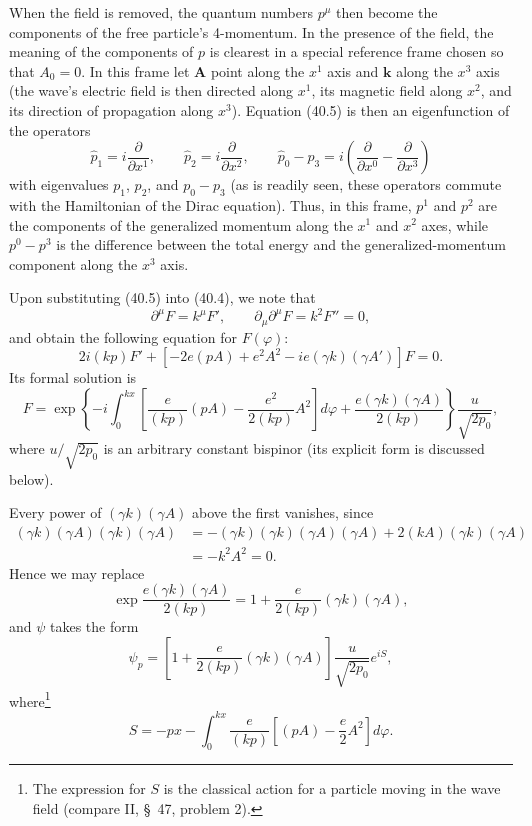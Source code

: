When the field is removed, the quantum numbers $p^\mu$ then become the components of the free particle's 4-momentum. In the presence of the field, the meaning of the components of $p$ is clearest in a special reference frame chosen so that $A_0=0$. In this frame let $\mathbf A$ point along the $x^1$ axis and $\mathbf k$ along the $x^3$ axis (the wave's electric field is then directed along $x^1$, its magnetic field along $x^2$, and its direction of propagation along $x^3$). Equation (40.5) is then an eigenfunction of the operators
\[
\widehat p_1=i\frac\partial{\partial x^1},
\qquad
\widehat p_2=i\frac\partial{\partial x^2},
\qquad
\widehat p_0-\widehat p_3=i\left(\frac\partial{\partial x^0}-\frac\partial{\partial x^3}\right)
\]
with eigenvalues $p_1$, $p_2$, and $p_0-p_3$ (as is readily seen, these operators commute with the Hamiltonian of the Dirac equation). Thus, in this frame, $p^1$ and $p^2$ are the components of the generalized momentum along the $x^1$ and $x^2$ axes, while $p^0-p^3$ is the difference between the total energy and the generalized-momentum component along the $x^3$ axis.

Upon substituting (40.5) into (40.4), we note that
\[
\partial^\mu F=k^\mu F',
\qquad
\partial_\mu\partial^\mu F=k^2F''=0,
\]
and obtain the following equation for $F(\varphi)$:
\[
2i(kp)F'+[-2e(pA)+e^2A^2-ie(\gamma k)(\gamma A')]F=0.
\]
Its formal solution is
\[
F=\exp\left\{-i\int_0^{kx}\left[\frac e{(kp)}(pA)-\frac{e^2}{2(kp)}A^2\right]d\varphi
+\frac{e(\gamma k)(\gamma A)}{2(kp)}\right\}\frac u{\sqrt{2p_0}},
\]
where $u/\sqrt{2p_0}$ is an arbitrary constant bispinor (its explicit form is discussed below).

Every power of $(\gamma k)(\gamma A)$ above the first vanishes, since
\[
\begin{aligned}
(\gamma k)(\gamma A)(\gamma k)(\gamma A)
&=-(\gamma k)(\gamma k)(\gamma A)(\gamma A)
+2(kA)(\gamma k)(\gamma A)\\
&=-k^2A^2=0.
\end{aligned}
\]
Hence we may replace
\[
\exp\frac{e(\gamma k)(\gamma A)}{2(kp)}
=1+\frac e{2(kp)}(\gamma k)(\gamma A),
\]
and $\psi$ takes the form
\begin{equation}
\psi_p=\left[1+\frac e{2(kp)}(\gamma k)(\gamma A)\right]
\frac u{\sqrt{2p_0}}e^{iS},
\tag{40.7}
\end{equation}
where\footnote{The expression for $S$ is the classical action for a particle moving in the wave field (compare II, \S~47, problem 2).}
\begin{equation}
S=-px-\int_0^{kx}\frac e{(kp)}\left[(pA)-\frac e2A^2\right]d\varphi.
\tag{40.8}
\end{equation}

